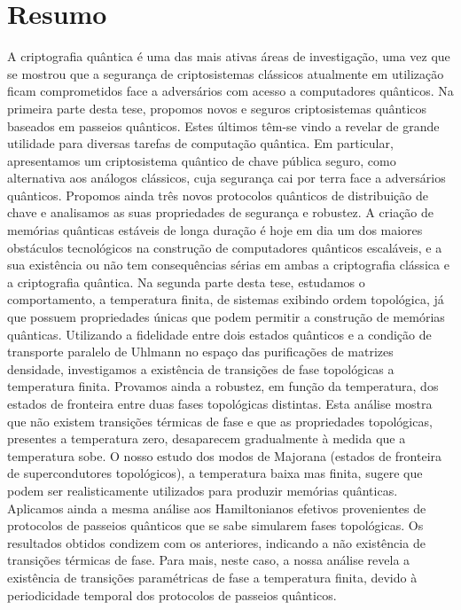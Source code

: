 

\chapter*{Resumo}

A criptografia qu\^{a}ntica \'{e} uma das mais ativas \'{a}reas de investiga\c{c}\~{a}o, uma vez que se mostrou que a segurança de criptosistemas cl\'{a}ssicos atualmente em utiliza\c{c}\~{a}o ficam comprometidos face a advers\'{a}rios com acesso a computadores qu\^{a}nticos. Na primeira parte desta tese, propomos novos e seguros criptosistemas qu\^{a}nticos baseados em passeios qu\^{a}nticos. Estes \'{u}ltimos t\^{e}m-se vindo a revelar de grande utilidade para diversas tarefas de computa\c{c}\~{a}o qu\^{a}ntica. Em particular, apresentamos um criptosistema qu\^{a}ntico de chave p\'{u}blica seguro, como alternativa aos an\'{a}logos cl\'{a}ssicos, cuja seguran\c{c}a cai por terra face a advers\'{a}rios qu\^{a}nticos. Propomos ainda tr\^{e}s novos protocolos qu\^{a}nticos de distribui\c{c}\~{a}o de chave e analisamos as suas propriedades de seguran\c{c}a e robustez.
A cria\c{c}\~{a}o de mem\'{o}rias qu\^{a}nticas est\'{a}veis de longa dura\c{c}\~{a}o é hoje em dia um dos maiores obst\'{a}culos tecnol\'{o}gicos na constru\c{c}\~{a}o de computadores qu\^{a}nticos escal\'{a}veis, e a sua exist\^{e}ncia ou n\~{a}o tem consequ\^{e}ncias s\'{e}rias em ambas a criptografia cl\'{a}ssica e a criptografia qu\^{a}ntica. Na segunda parte desta tese, estudamos o comportamento, a temperatura finita, de sistemas exibindo ordem topol\'{o}gica, j\'{a} que possuem propriedades \'{u}nicas que podem permitir a constru\c{c}\~{a}o de mem\'{o}rias qu\^{a}nticas. Utilizando a fidelidade entre dois estados qu\^{a}nticos e a condi\c{c}\~{a}o de transporte paralelo de Uhlmann no espa\c{c}o das purifica\c{c}\~{o}es de matrizes densidade, investigamos a exist\^{e}ncia de transi\c{c}\~{o}es de fase topol\'{o}gicas a temperatura finita. Provamos ainda a robustez, em fun\c{c}\~{a}o da temperatura, dos estados de fronteira entre duas fases topol\'{o}gicas distintas. Esta an\'{a}lise mostra que n\~{a}o existem transi\c{c}\~{o}es t\'{e}rmicas de fase e que as propriedades topol\'{o}gicas, presentes a temperatura zero, desaparecem gradualmente \`{a} medida que a temperatura sobe. O nosso estudo dos modos de Majorana (estados de fronteira de supercondutores topol\'{o}gicos), a temperatura baixa mas finita, sugere que podem ser realisticamente utilizados para produzir mem\'{o}rias qu\^{a}nticas.
Aplicamos ainda a mesma an\'{a}lise aos Hamiltonianos efetivos provenientes de protocolos de passeios qu\^{a}nticos que se sabe simularem fases topol\'{o}gicas. Os resultados obtidos condizem com os anteriores, indicando a n\~{a}o exist\^{e}ncia de transi\c{c}\~{o}es t\'{e}rmicas de fase. Para mais, neste caso, a nossa an\'{a}lise revela a exist\^{e}ncia de transi\c{c}\~{o}es param\'{e}tricas de fase a temperatura finita, devido \`{a} periodicidade temporal dos protocolos de passeios qu\^{a}nticos.
